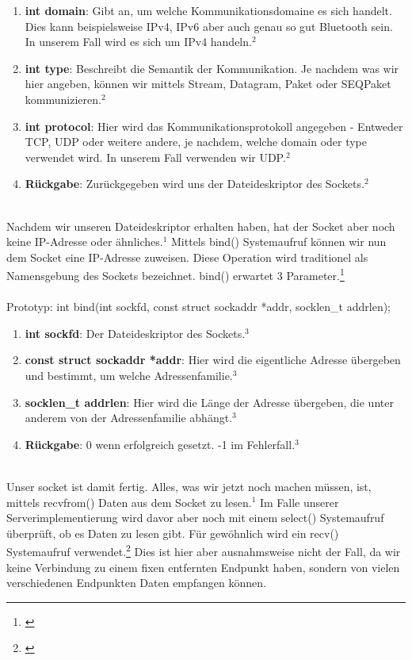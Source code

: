 \begin{enumerate}
    \item \textbf{int domain}: Gibt an, um welche Kommunikationsdomaine es sich handelt. Dies kann beispielsweise IPv4, IPv6 aber auch genau so gut Bluetooth sein. In unserem Fall wird es sich um IPv4 handeln.$^{2}$
    \item \textbf{int type}: Beschreibt die Semantik der Kommunikation. Je nachdem was wir hier angeben, können wir mittels Stream, Datagram, Paket oder SEQPaket kommunizieren.$^{2}$
    \item \textbf{int protocol}: Hier wird das Kommunikationsprotokoll angegeben - Entweder TCP, UDP oder weitere andere, je nachdem, welche domain oder type verwendet wird. In unserem Fall verwenden wir UDP.$^{2}$
    \item \textbf{Rückgabe}: Zurückgegeben wird uns der Dateideskriptor des Sockets.$^{2}$
\end{enumerate} 
\ \\%
Nachdem wir unseren Dateideskriptor erhalten haben, hat der Socket aber noch keine IP-Adresse oder ähnliches.$^{1}$ Mittels bind() Systemaufruf können wir nun dem Socket eine IP-Adresse zuweisen. Diese Operation wird traditionel als Namensgebung des Sockets bezeichnet. bind() erwartet 3 Parameter.\footnote[3]{\cite[Vgl.][]{SRV16}}
\\\\
Prototyp: int bind(int sockfd, const struct sockaddr *addr, socklen\_t addrlen);
\begin{enumerate}
    \item \textbf{int sockfd}: Der Dateideskriptor des Sockets.$^{3}$
    \item \textbf{const struct sockaddr *addr}: Hier wird die eigentliche Adresse übergeben und bestimmt, um welche Adressenfamilie.$^{3}$
    \item \textbf{socklen\_t addrlen}: Hier wird die Länge der Adresse übergeben, die unter anderem von der Adressenfamilie abhängt.$^{3}$
    \item \textbf{Rückgabe}: 0 wenn erfolgreich gesetzt. -1 im Fehlerfall.$^{3}$
\end{enumerate} 
\ \\%
Unser socket ist damit fertig. Alles, was wir jetzt noch machen müssen, ist, mittels recvfrom() Daten aus dem Socket zu lesen.$^{1}$ Im Falle unserer Serverimplementierung wird davor aber noch mit einem select() Systemaufruf überprüft, ob es Daten zu lesen gibt. Für gewöhnlich wird ein recv() Systemaufruf verwendet.\footnote[4]{\cite[Vgl.][]{SRV17}} Dies ist hier aber ausnahmsweise nicht der Fall, da wir keine Verbindung zu einem fixen entfernten Endpunkt haben, sondern von vielen verschiedenen Endpunkten Daten empfangen können.
